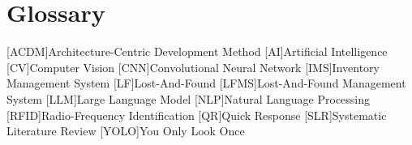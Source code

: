 \chapter{Glossary}

\footnotesize
\DoubleSpacing

\begin{acronym}[ai]
	[ACDM]{Architecture-Centric Development Method}
	[AI]{Artificial Intelligence}
	[CV]{Computer Vision}
	[CNN]{Convolutional Neural Network}
	[IMS]{Inventory Management System}
	[LF]{Lost-And-Found}
	[LFMS]{Lost-And-Found Management System}
	[LLM]{Large Language Model}
	[NLP]{Natural Language Processing}
	[RFID]{Radio-Frequency Identification}
	[QR]{Quick Response}
	[SLR]{Systematic Literature Review}
	[YOLO]{You Only Look Once}
\end{acronym}

